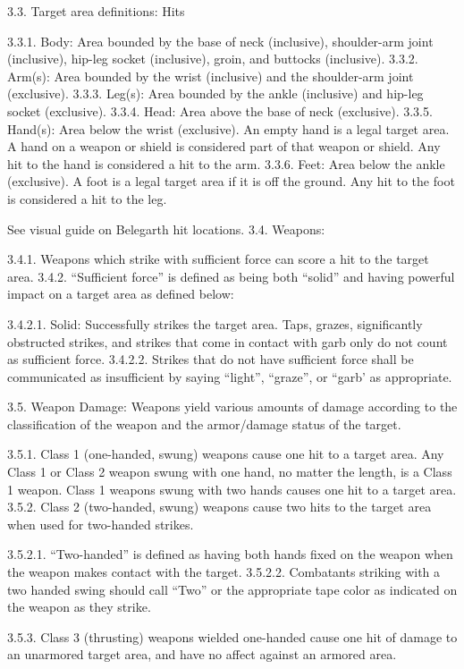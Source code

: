 \documentclass[12pt]{article}
\begin{document}
\begin{level}[start=0]
3.3. Target area definitions: Hits

3.3.1. Body: Area bounded by the base of neck (inclusive), shoulder-arm joint (inclusive), hip-leg socket (inclusive), groin, and buttocks (inclusive).
3.3.2. Arm(s): Area bounded by the wrist (inclusive) and the shoulder-arm joint (exclusive).
3.3.3. Leg(s): Area bounded by the ankle (inclusive) and hip-leg socket (exclusive).
3.3.4. Head: Area above the base of neck (exclusive).
3.3.5. Hand(s): Area below the wrist (exclusive). An empty hand is a legal target area. A hand on a weapon or shield is considered part of that weapon or shield. Any hit to the hand is considered a hit to the arm.
3.3.6. Feet: Area below the ankle (exclusive). A foot is a legal target area if it is off the ground. Any hit to the foot is considered a hit to the leg.

See visual guide on Belegarth hit locations.
3.4. Weapons:

3.4.1. Weapons which strike with sufficient force can score a hit to the target area.
3.4.2. “Sufficient force” is defined as being both “solid” and having powerful impact on a target area as defined below:

3.4.2.1. Solid: Successfully strikes the target area. Taps, grazes, significantly obstructed strikes, and strikes that come in contact with garb only do not count as sufficient force.
3.4.2.2. Strikes that do not have sufficient force shall be communicated as insufficient by saying “light”, “graze”, or “garb’ as appropriate.

3.5. Weapon Damage: Weapons yield various amounts of damage according to the classification of the weapon and the armor/damage status of the target.

3.5.1. Class 1 (one-handed, swung) weapons cause one hit to a target area. Any Class 1 or Class 2 weapon swung with one hand, no matter the length, is a Class 1 weapon. Class 1 weapons swung with two hands causes one hit to a target area.
3.5.2. Class 2 (two-handed, swung) weapons cause two hits to the target area when used for two-handed strikes.

3.5.2.1. “Two-handed” is defined as having both hands fixed on the weapon when the weapon makes contact with the target.
3.5.2.2. Combatants striking with a two handed swing should call “Two” or the appropriate tape color as indicated on the weapon as they strike.

3.5.3. Class 3 (thrusting) weapons wielded one-handed cause one hit of damage to an unarmored target area, and have no affect against an armored area.


\end{level}
\end{document}
